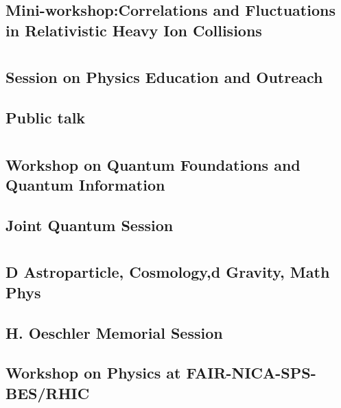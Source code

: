 \subsection{Mini-workshop:Correlations and Fluctuations in Relativistic Heavy Ion Collisions}

\clearpage

\section{}
\subsection{Session on Physics Education  and Outreach}

\clearpage

\subsection{Public talk}

\clearpage

\section{}
\subsection{Workshop on Quantum Foundations and Quantum Information}

\clearpage

\subsection{Joint Quantum Session}

\clearpage

\section{}
\subsection{D Astroparticle, Cosmology,d Gravity, Math Phys}

\clearpage

\subsection{H. Oeschler Memorial Session}

\clearpage

\subsection{Workshop on Physics at FAIR-NICA-SPS-BES/RHIC}

\clearpage

